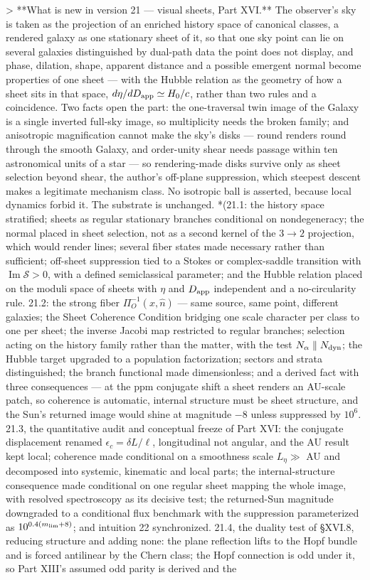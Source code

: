 > **What is new in version 21 — visual sheets, Part XVI.** The observer's sky is taken as the projection of an enriched history space of canonical classes, a rendered galaxy as one stationary sheet of it, so that one sky point can lie on several galaxies distinguished by dual-path data the point does not display, and phase, dilation, shape, apparent distance and a possible emergent normal become properties of one sheet — with the Hubble relation as the geometry of how a sheet sits in that space, $d\eta/dD_{\rm app}\simeq H_0/c$, rather than two rules and a coincidence. Two facts open the part: the one-traversal twin image of the Galaxy is a single inverted full-sky image, so multiplicity needs the broken family; and anisotropic magnification cannot make the sky's disks — round renders round through the smooth Galaxy, and order-unity shear needs passage within ten astronomical units of a star — so rendering-made disks survive only as sheet selection beyond shear, the author's off-plane suppression, which steepest descent makes a legitimate mechanism class. No isotropic ball is asserted, because local dynamics forbid it. The substrate is unchanged. *(21.1: the history space stratified; sheets as regular stationary branches conditional on nondegeneracy; the normal placed in sheet selection, not as a second kernel of the $3\to2$ projection, which would render lines; several fiber states made necessary rather than sufficient; off-sheet suppression tied to a Stokes or complex-saddle transition with $\operatorname{Im}\mathcal S>0$, with a defined semiclassical parameter; and the Hubble relation placed on the moduli space of sheets with $\eta$ and $D_{\rm app}$ independent and a no-circularity rule. 21.2: the strong fiber $\Pi_O^{-1}(x,\hat n)$ — same source, same point, different galaxies; the Sheet Coherence Condition bridging one scale character per class to one per sheet; the inverse Jacobi map restricted to regular branches; selection acting on the history family rather than the matter, with the test $N_\alpha\parallel N_{\rm dyn}$; the Hubble target upgraded to a population factorization; sectors and strata distinguished; the branch functional made dimensionless; and a derived fact with three consequences — at the ppm conjugate shift a sheet renders an AU-scale patch, so coherence is automatic, internal structure must be sheet structure, and the Sun's returned image would shine at magnitude $-8$ unless suppressed by $10^6$. 21.3, the quantitative audit and conceptual freeze of Part XVI: the conjugate displacement renamed $\epsilon_c = \delta L/\ell$, longitudinal not angular, and the AU result kept local; coherence made conditional on a smoothness scale $L_\eta\gg$ AU and decomposed into systemic, kinematic and local parts; the internal-structure consequence made conditional on one regular sheet mapping the whole image, with resolved spectroscopy as its decisive test; the returned-Sun magnitude downgraded to a conditional flux benchmark with the suppression parameterized as $10^{0.4(m_{\rm lim}+8)}$; and intuition 22 synchronized. 21.4, the duality test of §XVI.8, reducing structure and adding none: the plane reflection lifts to the Hopf bundle and is forced antilinear by the Chern class; the Hopf connection is odd under it, so Part XIII's assumed odd parity is derived and the 